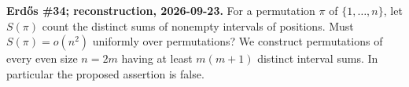 \textbf{Erd\H{o}s \#34; reconstruction, 2026-09-23.}
For a permutation $\pi$ of $\{1,\ldots,n\}$, let $S(\pi)$ count the
distinct sums of nonempty intervals of positions. Must $S(\pi)=o(n^2)$
uniformly over permutations? We construct permutations of every even
size $n=2m$ having at least $m(m+1)$ distinct interval sums. In particular
the proposed assertion is false.
